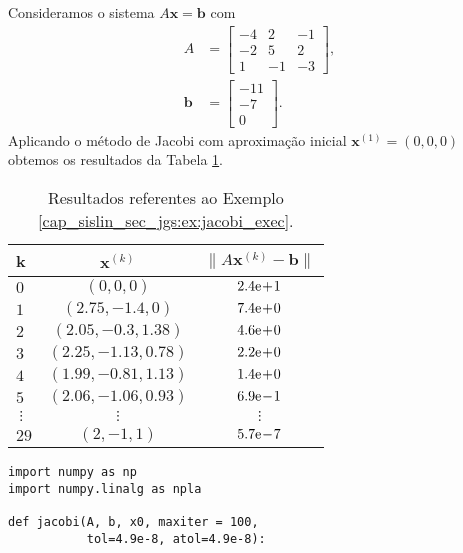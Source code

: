 \begin{ex}\label{cap_sislin_sec_jgs:ex:jacobi_exec}
  Consideramos o sistema $A\pmb{x} = \pmb{b}$ com
  \begin{equation}
    \begin{aligned}
    A &=
    \begin{bmatrix}
      -4 & 2 & -1 \\
      -2 & 5 & 2 \\
       1 & -1 & -3
    \end{bmatrix},\\
    \pmb{b} &=
    \begin{bmatrix}
      -11\\ -7\\ 0
    \end{bmatrix}.
  \end{aligned}
  \end{equation}
  Aplicando o método de Jacobi com aproximação inicial $\pmb{x}^{(1)} = (0, 0, 0)$ obtemos os resultados da Tabela \ref{cap_sislin_sec_jgs:tab:ex_jacobi_exec}.

  \begin{table}[h!]
    \centering
    \begin{tabular}{l|cc}
      k & $\pmb{x}^{(k)}$ & $\|A\pmb{x}^{(k)}-\pmb{b}\|$\\\hline
      $0$ & $(0, 0, 0)$ & $2.4\mathrm{e}\!+\!1$ \\
      $1$ & $(2.75, -1.4, 0)$ & $7.4\mathrm{e}\!+\!0$ \\
      $2$ & $(2.05, -0.3,  1.38)$ & $4.6\mathrm{e}\!+\!0$ \\
      $3$ & $(2.25, -1.13, 0.78)$ & $2.2\mathrm{e}\!+\!0$ \\
      $4$ & $(1.99, -0.81, 1.13)$ & $1.4\mathrm{e}\!+\!0$ \\
      $5$ & $(2.06, -1.06,  0.93)$ & $6.9\mathrm{e}\!-\!1$ \\
      $~\vdots$ & $\vdots$ & $\vdots$\\
      $29$ & $(2, -1,  1)$ & $5.7\mathrm{e}\!-\!7$\\\hline
    \end{tabular}
    \caption{Resultados referentes ao Exemplo \ref{cap_sislin_sec_jgs:ex:jacobi_exec}.}
    \label{cap_sislin_sec_jgs:tab:ex_jacobi_exec}
  \end{table}

\begin{lstlisting}[caption=jacobi.py, label=cap_sislin_sec_jgs:cod:jacobi]
import numpy as np
import numpy.linalg as npla

def jacobi(A, b, x0, maxiter = 100,
           tol=4.9e-8, atol=4.9e-8):
    

\end{lstlisting}
\end{ex}
